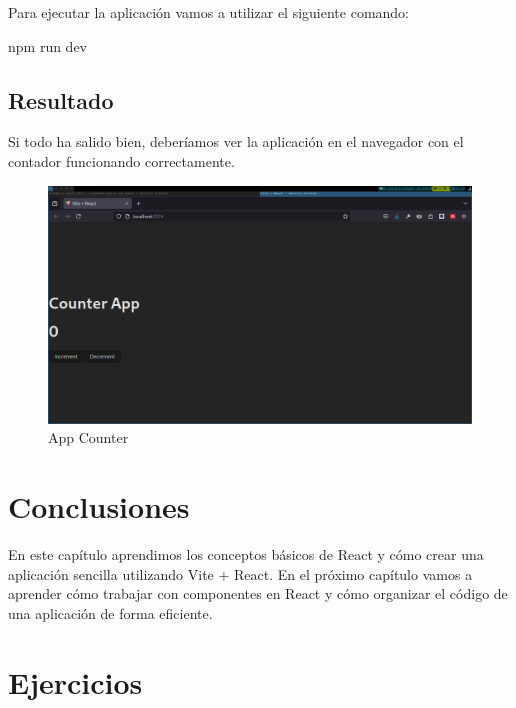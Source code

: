 \documentclass[
  a4paper,
  DIV=11,
  numbers=noendperiod,
  onepage,
  openany]{scrreprt}
\newenvironment{Shaded}{\begin{snugshade}}{\end{snugshade}}
\newcommand{\ExtensionTok}[1]{\textcolor[rgb]{0.00,0.23,0.31}{#1}}
\newcommand{\NormalTok}[1]{\textcolor[rgb]{0.00,0.23,0.31}{#1}}
\begin{document}
\begin{tcolorbox}
Para ejecutar la aplicación vamos a utilizar el siguiente comando:

\begin{Shaded}
\begin{Highlighting}[]
\ExtensionTok{npm}\NormalTok{ run dev}
\end{Highlighting}
\end{Shaded}

\subsection{Resultado}\label{resultado}

Si todo ha salido bien, deberíamos ver la aplicación en el navegador con
el contador funcionando correctamente.

\begin{figure}[H]

{\centering \includegraphics{images/counter.png}

}

\caption{App Counter}

\end{figure}%

\section{Conclusiones}\label{conclusiones-7}

En este capítulo aprendimos los conceptos básicos de React y cómo crear
una aplicación sencilla utilizando Vite + React. En el próximo capítulo
vamos a aprender cómo trabajar con componentes en React y cómo organizar
el código de una aplicación de forma eficiente.

\section{Ejercicios}\label{ejercicios-1}


\end{tcolorbox}
\end{document}
